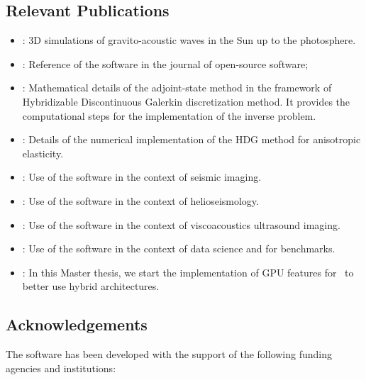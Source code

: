 \subsection{Relevant Publications}
\label{sec:Hawen:publications}

\begin{itemize}
\item \cite{hal_05393820}: 3D simulations of gravito-acoustic waves in the Sun up to the photosphere.
\item \cite{faucher_hawen_2021}: Reference of the software in the journal of open-source software;
\item \cite{Faucher2020adjoint}:
      Mathematical details of the adjoint-state method in the framework 
      of Hybridizable Discontinuous Galerkin discretization method.
      It provides the computational steps for the implementation of the 
      inverse problem.
\item \cite{pham_numerical_2024}: Details of the numerical implementation 
      of the HDG method for anisotropic elasticity.
\item \cite{Faucher2019FRgWIGeo,Faucher2020DAS}: 
      Use of the software in the context of seismic imaging.
\item \cite{Pham2020Siam,pham_assembling_2024}:
      Use of the software in the context of helioseismology.
\item \cite{Faucher2023viscoacoustic}: 
      Use of the software in the context of viscoacoustics ultrasound imaging.
\item \cite{Liu2024,Benitez2024}: 
      Use of the software in the context of data science and
      for benchmarks.
\item \cite{zotero-item-4586}: In this Master thesis, we start the implementation
      of GPU features for \hawen~to better use hybrid architectures.
\end{itemize}


\subsection{Acknowledgements}
\label{sec::Hawen:acknowledgements}

The software has been developed with the support of the following funding agencies and institutions: 

